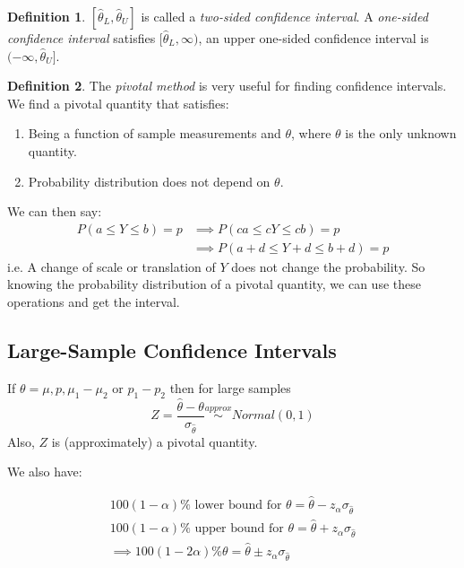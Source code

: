 \documentclass[12 pt]{article}
\theoremstyle{definition}
\newtheorem{defn}{Definition}
\begin{document}
    \begin{defn}
      $[\hat{\theta}_L, \hat{\theta}_U]$ is called a \textit{two-sided
      confidence interval}. A \textit{one-sided confidence interval}
    satisfies $[\hat{\theta}_L,\infty)$, an upper one-sided confidence
    interval is $(-\infty, \hat{\theta}_U]$.
  \end{defn}
  \begin{defn}
    The \textit{pivotal method} is very useful for finding confidence
    intervals. We find a pivotal quantity that satisfies:
    \begin{enumerate}
    \item Being a function of sample measurements and $\theta$, where
      $\theta$ is the only unknown quantity.
    \item Probability distribution does not depend on $\theta$.
    \end{enumerate}
    We can then say:
    \begin{align*}
      P(a \leq Y \leq b) = p &\implies P(ca \leq cY \leq cb) = p
      \\ & \implies P(a+d \leq Y+d \leq b+d) = p
    \end{align*}
    i.e. A change of scale or translation of $Y$ does not change the
    probability. So knowing the probability distribution of a pivotal
    quantity, we can use these operations and get the interval.
  \end{defn}
  \subsection{Large-Sample Confidence Intervals}
  If $\theta = \mu, p, \mu_1 - \mu_2$ or $p_1 - p_2$ then for large
  samples $$Z =
  \frac{\hat{\theta}-\theta}{\sigma_{\hat{\theta}}}\stackrel{approx}{\sim}Normal(0,1)$$
  Also, $Z$ is (approximately) a pivotal quantity.

  We also have:

  \begin{align*}
    100(1-\alpha)\% \text{ lower bound for }\theta = \hat{\theta}-z_{\alpha}\sigma_{\hat{\theta}}
    \\100(1-\alpha)\% \text{ upper bound for }\theta = \hat{\theta}+z_{\alpha}\sigma_{\hat{\theta}}
    \\ \implies 100(1-2\alpha)\%\theta = \hat{\theta}\pm z_{\alpha}\sigma_{\hat{\theta}}
  \end{align*}
\end{document}

